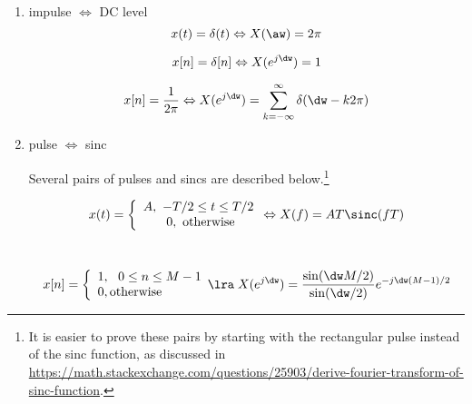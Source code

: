 \begin{enumerate}

\item impulse $\Leftrightarrow$ DC level
\[
x(t) = \delta(t) \Leftrightarrow X(\aw)= 2 \pi
\]

\[
x[n] = \delta[n] \Leftrightarrow X(e^{j \dw})=1
\]

\[
x[n] = \frac{1}{2 \pi} \Leftrightarrow X(e^{j \dw})=\sum_{k= -\infty}^\infty \delta(\dw - k 2 \pi)
\]

\item pulse $\Leftrightarrow$ sinc

Several pairs of pulses and sincs are described below.\footnote{It is easier to prove these pairs by starting with the rectangular pulse instead of the sinc function, as discussed in \url{https://math.stackexchange.com/questions/25903/derive-fourier-transform-of-sinc-function}.}

\begin{equation}
x(t) = \left\{ {\begin{array}{*{20}c} {A,~-T/2 \le t \le T/2} \\ {~ 0,{~\textrm{otherwise}}} \\ \end{array} \Leftrightarrow } \right. X(f) = A T \sinc(fT)
\label{eq:sinc_transform}
\end{equation}
~\newline

\begin{equation}
x[n] = \left\{ {\begin{array}{*{20}l} {1,~~0 \le n \le M - 1} \\ {0,{\textrm{otherwise}}} \\ \end{array} \lra } \right. X(e^{j \dw}) = \frac{{\sin (\dw M/2)}}{{\sin (\dw /2)}}e^{ - j\dw (M - 1)/2}
\label{eq:discrete_sinc_transform}
\end{equation}



\end{enumerate}
